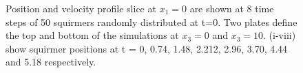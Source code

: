 \begin{figure}
\begin{subfigure}[b]{0.4\textwidth}
    \caption[]{\label{fig:squirmerH}}
\end{subfigure}
\label{fig:SquiremerGyro}
\caption[Position and velocity profile at 8 time steps of 50 squiremrs randomly distributed at t=0.]{Position and velocity profile slice at $x_1=0$ are shown at 8 time steps of 50 squirmers randomly distributed at t=0. Two plates define the top and bottom of the simulations at $x_3 = 0$ and  $x_3 = 10$. (i-viii) show squirmer positions at t = 0, 0.74, 1.48, 2.212, 2.96, 3.70, 4.44 and 5.18 respectively.}
\end{figure}

